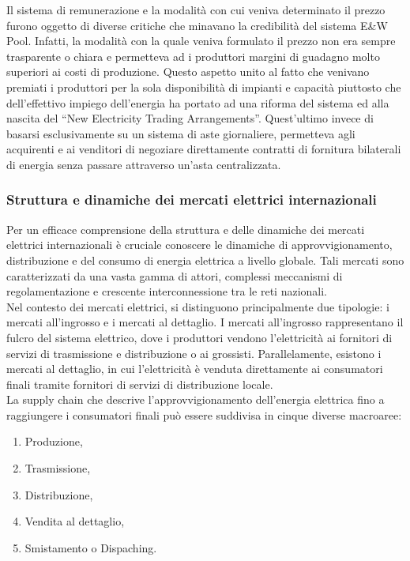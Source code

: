\documentclass{article}
\begin{document}
Il sistema di remunerazione e la modalità con cui veniva determinato il prezzo furono oggetto di diverse critiche che minavano la credibilità del sistema E\&W Pool. Infatti, la modalità con la quale veniva formulato il prezzo non era sempre trasparente o chiara e permetteva ad i produttori margini di guadagno molto superiori ai costi di produzione. Questo aspetto unito al fatto che venivano premiati i produttori per la sola disponibilità di impianti e capacità piuttosto che dell’effettivo impiego dell’energia ha portato ad una riforma del sistema ed alla nascita del “New Electricity Trading Arrangements”. Quest’ultimo invece di basarsi esclusivamente su un sistema di aste giornaliere, permetteva agli acquirenti e ai venditori di negoziare direttamente contratti di fornitura bilaterali di energia senza passare attraverso un'asta centralizzata.
\subsubsection{Struttura e dinamiche dei mercati elettrici internazionali}
Per un efficace comprensione della struttura e delle dinamiche dei mercati elettrici internazionali è cruciale conoscere le dinamiche di approvvigionamento, distribuzione e del consumo di energia elettrica a livello globale. Tali mercati sono caratterizzati da una vasta gamma di attori, complessi meccanismi di regolamentazione e crescente interconnessione tra le reti nazionali.\\
Nel contesto dei mercati elettrici, si distinguono principalmente due tipologie: i mercati all'ingrosso e i mercati al dettaglio. I mercati all'ingrosso rappresentano il fulcro del sistema elettrico, dove i produttori vendono l'elettricità ai fornitori di servizi di trasmissione e distribuzione o ai grossisti. Parallelamente, esistono i mercati al dettaglio, in cui l'elettricità è venduta direttamente ai consumatori finali tramite fornitori di servizi di distribuzione locale.\\
La supply chain che descrive l’approvvigionamento dell’energia elettrica fino a raggiungere i consumatori finali può essere suddivisa in cinque diverse macroaree:\cite{EoE2019}
\begin{enumerate}
    \item Produzione,
    \item Trasmissione,
    \item Distribuzione,
    \item Vendita al dettaglio,
    \item Smistamento o Dispaching.
\end{enumerate}
\end{document}
